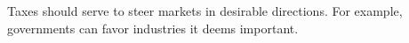 Taxes should serve to steer markets in desirable directions. For example, governments can favor industries it deems important.
